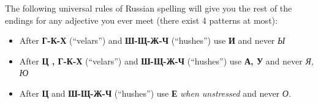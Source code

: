 The following universal rules of Russian spelling will give you the rest
of the endings for any adjective you ever meet (there exist 4 patterns
at most):

\begin{itemize}
\tightlist
\item
  After \textbf{Г-К-Х} (``velars'') and \textbf{Ш-Щ-Ж-Ч} (``hushes'')
  use \textbf{И} and never \emph{Ы}
\item
  After \textbf{Ц , Г-К-Х} (``velars'') and \textbf{Ш-Щ-Ж-Ч}
  (``hushes'') use \textbf{А, У} and never \emph{Я, Ю}
\item
  After \textbf{Ц} and \textbf{Ш-Щ-Ж-Ч} (``hushes'') use \textbf{Е}
  \emph{when unstressed} and never \emph{О}.
\end{itemize}
